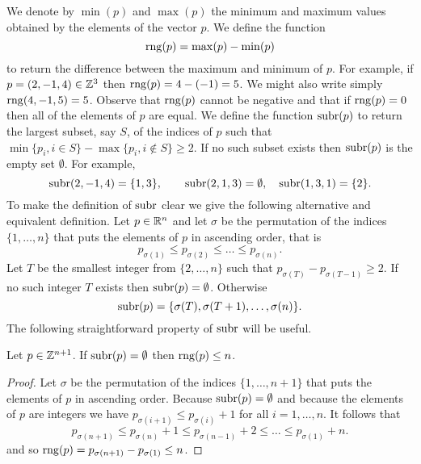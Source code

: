 \documentclass[final,leqno]{siamltex}
\begin{document}
We denote by $\min(p)$ and $\max(p)$ the minimum and maximum values obtained by the elements of the vector $p$.  We define the function
\[
\operatorname{rng}(p) = \max(p) - \min(p)
\] 
to return the difference between the maximum and minimum of $p$.  For example, if $p = (2,-1,4) \in {\mathbb Z}^3$ then $\operatorname{rng}(p) = 4 - (-1)=5$.  We might also write simply $\operatorname{rng}(4,-1,5)=5$.  Observe that $\operatorname{rng}(p)$ cannot be negative and that if $\operatorname{rng}(p) = 0$ then all of the elements of $p$ are equal.  We define the function $\operatorname{subr}(p)$ to return the largest subset, say $S$, of the indices of $p$ such that $\min\{p_i, i \in S\} - \max\{p_i, i \notin S\} \geq 2.$  If no such subset exists then $\operatorname{subr}(p)$ is the empty set $\emptyset$.  For example, 
\[
\operatorname{subr}(2,-1,4) = \{1,3\}, \qquad \operatorname{subr}(2,1,3) = \emptyset, \quad  \operatorname{subr}(1,3,1) = \{2\}.
\]  
To make the definition of $\operatorname{subr}$ clear we give the following alternative and equivalent definition.  Let $p \in {\mathbb R}^n$ and let $\sigma$ be the permutation of the indices $\{1,\dots,n\}$ that puts the elements of $p$ in ascending order, that is
\[
p_{\sigma(1)} \leq p_{\sigma(2)} \leq \dots \leq p_{\sigma(n)}.
\]  
Let $T$ be the smallest integer from $\{2,\dots,n\}$ such that $p_{\sigma(T)} - p_{\sigma(T-1)} \geq 2$.  If no such integer $T$ exists then $\operatorname{subr}(p) = \emptyset$.  Otherwise 
\[
\operatorname{subr}(p) =  \{ \sigma(T), \sigma(T+1), \dots, \sigma(n) \}.
\]
The following straightforward property of $\operatorname{subr}$ will be useful.

\begin{proposition}\label{prop:subrrngsmall}
Let $p \in {\mathbb Z}^{n+1}$.  If $\operatorname{subr}(p) = \emptyset$ then $\operatorname{rng}(p) \leq n$.
\end{proposition}
\begin{proof}
Let $\sigma$ be the permutation of the indices $\{1,\dots,n+1\}$ that puts the elements of $p$ in ascending order.  Because $\operatorname{subr}(p) = \emptyset$ and because the elements of $p$ are integers we have $p_{\sigma(i+1)} \leq p_{\sigma(i)} + 1$ for all $i=1,\dots,n$.  It follows that
\[
p_{\sigma(n+1)} \leq p_{\sigma(n)} + 1 \leq p_{\sigma(n-1)} + 2 \leq \dots \leq p_{\sigma(1)} + n.
\]
and so $\operatorname{rng}(p) = p_{\sigma(n+1)} - p_{\sigma(1)} \leq n$.
\end{proof}
\end{document}
